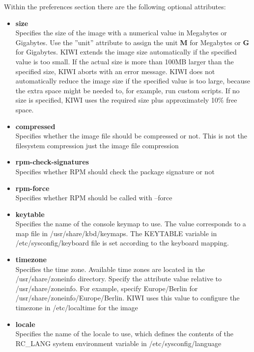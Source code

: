 Within the preferences section there are the following optional
attributes:

\begin{itemize}
\item \textbf{size}\\
      Specifies the size of the image with a numerical value in
      Megabytes or Gigabytes. Use the ''unit'' attribute to assign the
      unit \textbf{M} for Megabytes or \textbf{G} for Gigabytes.
      KIWI extends the image size automatically if the specified value
      is too small. If the actual size is more than 100MB larger than
      the specified size, KIWI aborts with an error
      message. KIWI does not automatically reduce the image size if
      the specified value is too large, because the extra space might
      be needed to, for example, run custom scripts. If no size is
      specified, KIWI uses the required size plus approximately
      10\% free space.
\item \textbf{compressed}\\
      Specifies whether the image file should be compressed or not.
      This is not the filesystem compression just the image file compression
\item \textbf{rpm-check-signatures}\\
      Specifies whether RPM should check the package signature or not
\item \textbf{rpm-force}\\
      Specifies whether RPM should be called with --force
\item \textbf{keytable}\\
      Specifies the name of the console keymap to use. The value corresponds
      to a map file in /usr/share/kbd/keymaps. The KEYTABLE variable in
      /etc/sysconfig/keyboard file is set according to the keyboard
      mapping.
\item \textbf{timezone}\\
      Specifies the time zone. Available time zones are located in the
      /usr/share/zoneinfo directory. Specify the attribute value relative to
      /usr/share/zoneinfo. For example, specify Europe/Berlin for
      /usr/share/zoneinfo/Europe/Berlin. KIWI uses this value to configure
      the timezone in /etc/localtime for the image
\item \textbf{locale}\\
      Specifies the name of the locale to use, which defines the
      contents of the RC\_LANG system environment variable in
      /etc/sysconfig/language

\end{itemize}
